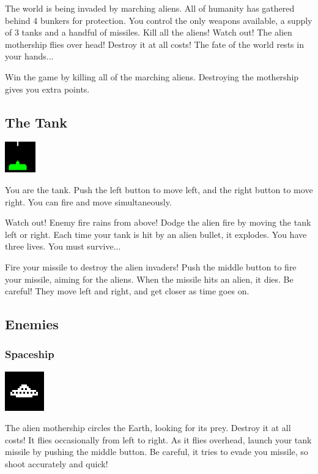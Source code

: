 \documentclass[11pt,letter,oneside]{report}
\begin{document}
The world is being invaded by marching aliens.  All of humanity has gathered behind 4 bunkers for protection.  You control the only weapons available, a supply of 3 tanks and a handful of missiles. Kill all the aliens! Watch out! The alien mothership flies over head! Destroy it at all costs!  The fate of the world rests in your hands...

Win the game by killing all of the marching aliens. Destroying the mothership gives you extra points.

\subsection{The Tank}
\includegraphics[]{tank.jpg}

You are the tank. Push the left button to move left, and the right button to move right. You can fire and move simultaneously.

Watch out! Enemy fire rains from above! Dodge the alien fire by moving the tank left or right. Each time your tank is hit by an alien bullet, it explodes. You have three lives.  You must survive...

Fire your missile to destroy the alien invaders! Push the middle button to fire your missile, aiming for the aliens. When the missile hits an alien, it dies. Be careful! They move left and right, and get closer as time goes on.

\subsection{Enemies}

\subsubsection{Spaceship}
\includegraphics[]{big-alien.png}

The alien mothership circles the Earth, looking for its prey. Destroy it at all costs! It flies occasionally from left to right. As it flies overhead, launch your tank missile by pushing the middle button. Be careful, it tries to evade you missile, so shoot accurately and quick!
\end{document}
